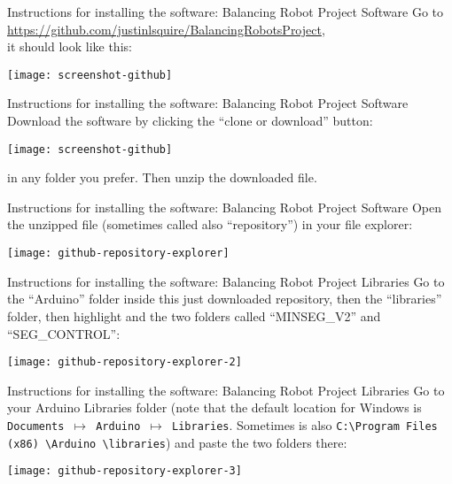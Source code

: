 \begin{frame}[t]{Instructions for installing the software: Balancing Robot Project Software}
	Go to \url{https://github.com/justinlsquire/BalancingRobotsProject}, \\ it should look like this:
	\begin{center}
		\texttt{[image: screenshot-github]}
	\end{center}
\end{frame}


\begin{frame}[t]{Instructions for installing the software: Balancing Robot Project Software}
	Download the software by clicking the ``clone or download'' button:
	\begin{center}
		\texttt{[image: screenshot-github]}
	\end{center}
	in any folder you prefer. Then unzip the downloaded file.
\end{frame}


\begin{frame}{Instructions for installing the software: Balancing Robot Project Software}
	Open the unzipped file (sometimes called also ``repository'') in your file explorer:
	\begin{center}
		\texttt{[image: github-repository-explorer]}
	\end{center}
\end{frame}


\begin{frame}{Instructions for installing the software: Balancing Robot Project Libraries}
	Go to the ``Arduino'' folder inside this just downloaded repository, then the ``libraries'' folder, then highlight and  the two folders called ``MINSEG\_V2'' and ``SEG\_CONTROL'':
	\begin{center}
		\texttt{[image: github-repository-explorer-2]}
	\end{center}
\end{frame}


\begin{frame}{Instructions for installing the software: Balancing Robot Project Libraries}
Go to your Arduino Libraries folder (note that the default location for Windows is \texttt{Documents $\mapsto$ Arduino $\mapsto$ Libraries}. Sometimes is also \texttt{C:\textbackslash Program Files (x86) \textbackslash Arduino \textbackslash libraries}) and paste the two folders there:
	\begin{center}
		\texttt{[image: github-repository-explorer-3]}
	\end{center}
\end{frame}

